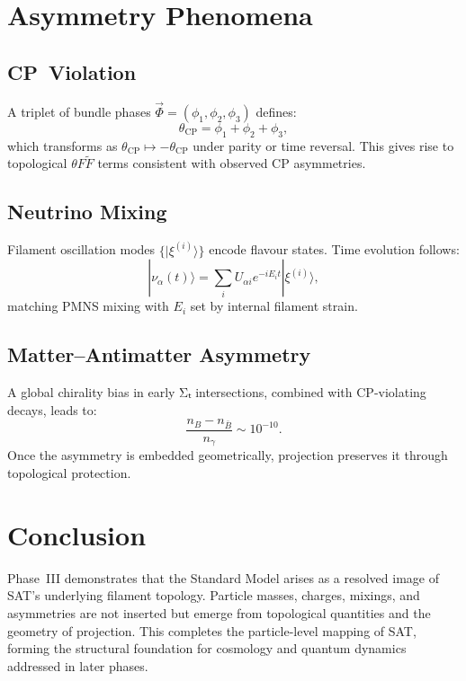 \section{Asymmetry Phenomena}

\subsection{CP~Violation}
A triplet of bundle phases $\vec{\Phi} = (\phi_1,\phi_2,\phi_3)$ defines:
\[
\theta_{\text{CP}} = \phi_1 + \phi_2 + \phi_3,
\]
which transforms as $\theta_{\text{CP}} \mapsto -\theta_{\text{CP}}$ under parity or time reversal. This gives rise to topological $\theta F\tilde F$ terms consistent with observed CP asymmetries.

\subsection{Neutrino Mixing}
Filament oscillation modes $\{|\xi^{(i)}\rangle\}$ encode flavour states. Time evolution follows:
\[
|\nu_\alpha(t)\rangle = \sum_i U_{\alpha i} e^{-i E_i t} |\xi^{(i)}\rangle,
\]
matching PMNS mixing with $E_i$ set by internal filament strain.

\subsection{Matter--Antimatter Asymmetry}
A global chirality bias in early Σₜ intersections, combined with CP-violating decays, leads to:
\[
\frac{n_B - n_{\bar B}}{n_\gamma} \sim 10^{-10}.
\]
Once the asymmetry is embedded geometrically, projection preserves it through topological protection.

\section{Conclusion}

Phase~III demonstrates that the Standard Model arises as a resolved image of SAT's underlying filament topology. Particle masses, charges, mixings, and asymmetries are not inserted but emerge from topological quantities and the geometry of projection. This completes the particle-level mapping of SAT, forming the structural foundation for cosmology and quantum dynamics addressed in later phases.
